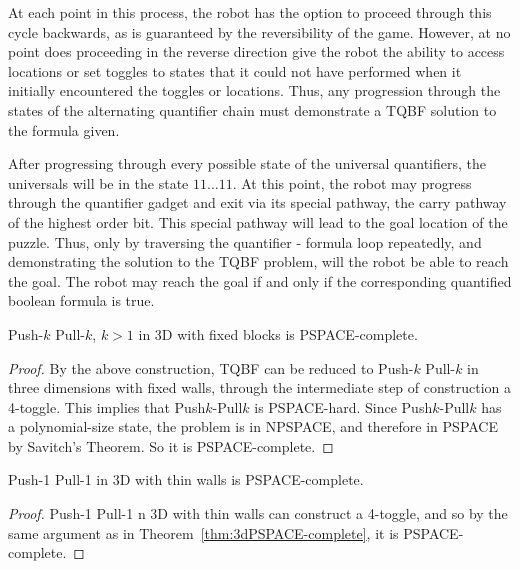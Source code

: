 At each point in this process, the robot has the option to proceed through this cycle backwards, as is
guaranteed by the reversibility of the game. However, at no point does proceeding in the reverse direction
give the robot the ability to access locations or set toggles to states that it could not have performed
when it initially encountered the toggles or locations. Thus, any progression through the states of the
alternating quantifier chain must demonstrate a TQBF solution to the formula given.

After progressing through every possible state of the universal quantifiers, the universals will be in the
state $11 \ldots 11$. At this point, the robot may progress through the quantifier gadget and exit via its special
pathway,
the carry pathway of the highest order bit. This special pathway will lead to the goal location of the puzzle.
Thus, only by traversing the quantifier - formula loop repeatedly, and demonstrating the solution to the TQBF
problem,
will the robot be able to reach the goal. The robot may reach the goal if and only if the corresponding quantified
boolean formula is true.

\begin{theorem}
    \label{thm:3dPSPACE-complete}
    Push-$k$ Pull-$k$, $k>1$ in 3D with fixed blocks is PSPACE-complete.
\end{theorem}
\begin{proof}
By the above construction, TQBF can be reduced to Push-$k$ Pull-$k$ in three dimensions with fixed walls, through the intermediate step of construction a 4-toggle. This implies that Push$k$-Pull$k$ is PSPACE-hard.
Since Push$k$-Pull$k$ has a polynomial-size state, the problem is in NPSPACE, and therefore in PSPACE by Savitch's Theorem\cite{SAVITCH1970177}. So it is PSPACE-complete.
\end{proof}

\begin{theorem}
    Push-1 Pull-1 in 3D with thin walls is PSPACE-complete.
\end{theorem}
\begin{proof}
    Push-1 Pull-1 n 3D with thin walls can construct a 4-toggle, and so by the same argument as in Theorem~\ref{thm:3dPSPACE-complete}, it is PSPACE-complete.
\end{proof}
